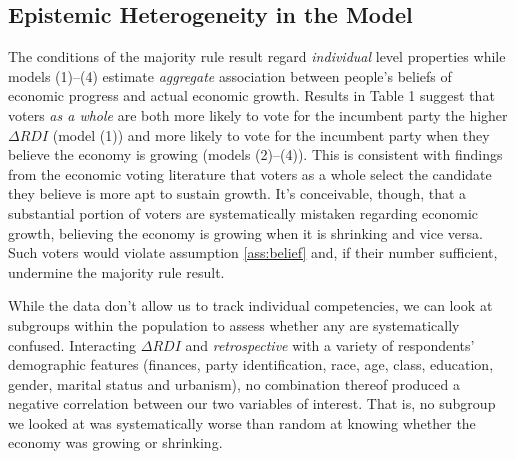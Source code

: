 \documentclass[11pt]{article}
\begin{document}

\subsection{Epistemic Heterogeneity in the Model}\label{sec:heterogeneity}
The conditions of the majority rule result regard \emph{individual} level
properties while  models (1)--(4) estimate
\emph{aggregate} association between people's beliefs of economic progress
and actual economic growth. Results in Table 1 suggest that voters \emph{as a whole} are both more likely to vote
for the incumbent party the higher $\Delta RDI$ (model (1)) and more
likely to vote for the incumbent party when they believe the economy
is growing (models (2)--(4)). This is consistent with findings from the economic voting literature that voters as
a whole select the candidate they believe is more apt to sustain growth. It's conceivable, though, that a substantial portion of voters are
systematically mistaken regarding economic growth, believing the
economy is growing when it is shrinking and vice versa.
Such voters would violate assumption \ref{ass:belief} and, if their number sufficient, undermine the majority rule result.

While the data don't allow us to track individual competencies, we can look at subgroups within the population to assess whether any are systematically confused.
Interacting $\Delta RDI$ and \emph{retrospective} with a variety of respondents'  demographic features (finances, party identification, race, age, class, education, gender, marital status and urbanism), no combination thereof  produced a negative correlation between our two variables of interest. That is, no subgroup we looked at was systematically worse than random at knowing whether the economy was growing or shrinking.
\end{document}
